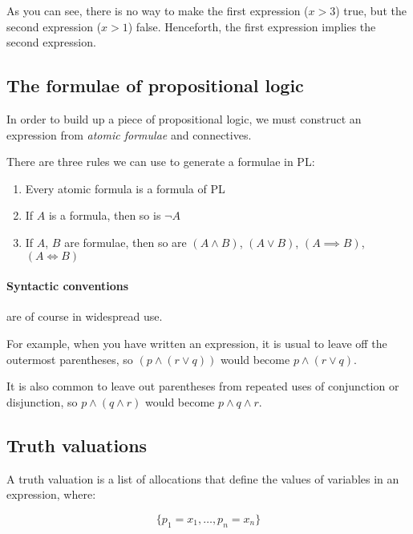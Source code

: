 As you can see, there is no way to make the first expression ($x>3$) true, but
the second expression ($x>1$) false. Henceforth, the first expression implies
the second expression.

\subsection{The formulae of propositional logic}

In order to build up a piece of propositional logic, we must construct an
expression from {\it atomic formulae} and connectives.

There are three rules we can use to generate a formulae in PL:

\begin{enumerate}
	\item Every atomic formula is a formula of PL
	\item If $A$ is a formula, then so is $\neg A$
	\item If $A$, $B$ are formulae, then so are $(A \wedge B)$, $(A \vee B)$, $(A \implies B)$, $(A \iff B)$
\end{enumerate}

\paragraph{Syntactic conventions} are of course in widespread use. 

For example, when you have written an expression, it is usual to leave off the
outermost parentheses, so $(p \wedge (r \vee q))$ would become $p \wedge (r \vee
q)$.

It is also common to leave out parentheses from repeated uses of conjunction or
disjunction, so $p \wedge (q \wedge r)$ would become $p \wedge q \wedge r$.

\subsection{Truth valuations}

A truth valuation is a list of allocations that define the values of variables
in an expression, where:

\begin{dmath}
	\{p_1=x_1,\dots, p_n=x_n\}
\end{dmath}

